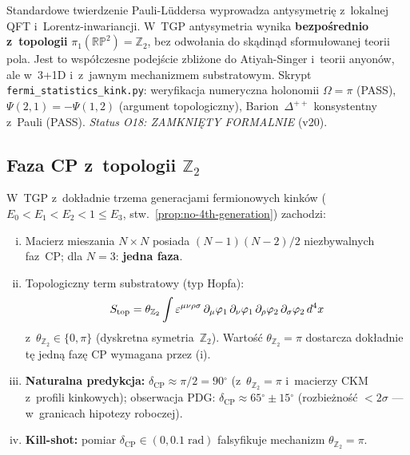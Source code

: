\begin{remark}\label{rem:spin-stat}
Standardowe twierdzenie Pauli-L\"uddersa wyprowadza antysymetri\k{e}
z~lokalnej QFT i~Lorentz-inwariancji.
W~TGP antysymetria wynika \textbf{bezpo\'srednio z~topologii}
$\pi_1(\mathbb{RP}^2) = \mathbb{Z}_2$, bez odwo\l{}ania do
sk\k{a}din\k{a}d sformu\l{}owanej teorii pola.
Jest to wsp\'o\l{}czesne podej\'scie zbli\.zone do Atiyah-Singer
i~teorii anyon\'ow, ale w~3+1D i~z~jawnym mechanizmem substratowym.
Skrypt \texttt{fermi\_statistics\_kink.py}:
weryfikacja numeryczna holo\-nomii $\Omega = \pi$ (PASS),
$\Psi(2,1) = -\Psi(1,2)$ (argument topologiczny),
Barion~$\Delta^{++}$ konsystentny z~Pauli (PASS).
\emph{Status O18: ZAMKNI\k{E}TY FORMALNIE} (v20).
\end{remark}

\subsection{Faza CP z~topologii $\mathbb{Z}_2$}\label{ssec:cp-violation}

\begin{proposition}[Konieczno\'s\'c naruszenia CP przy $N_{\rm gen}=3$]%
\label{prop:CP-necessity}
W~TGP z~dok\l{}adnie trzema generacjami fermionowych kink\'ow
($E_0 < E_1 < E_2 < 1 \le E_3$, stw.~\ref{prop:no-4th-generation})
zachodzi:
\begin{enumerate}[(i)]
  \item Macierz mieszania $N\times N$ posiada $(N-1)(N-2)/2$
    niezbywalnych faz~CP; dla $N = 3$: \textbf{jedna faza}.
  \item Topologiczny term substratowy (typ Hopfa):
    \begin{equation}\label{eq:S-top-Z2}
      S_{\rm top} = \theta_{\mathbb{Z}_2}
        \int \varepsilon^{\mu\nu\rho\sigma}\,
        \partial_\mu\varphi_1\,\partial_\nu\varphi_1\,
        \partial_\rho\varphi_2\,\partial_\sigma\varphi_2\,d^4x
    \end{equation}
    z~$\theta_{\mathbb{Z}_2} \in \{0, \pi\}$ (dyskretna symetria~$\mathbb{Z}_2$).
    Warto\'s\'c $\theta_{\mathbb{Z}_2} = \pi$ dostarcza dok\l{}adnie
    t\k{e} jedn\k{a} faz\k{e} CP wymagana przez (i).
  \item \textbf{Naturalna predykcja:} $\delta_{\mathrm{CP}} \approx \pi/2 = 90{^\circ}$
    (z~$\theta_{\mathbb{Z}_2} = \pi$ i~macierzy CKM z~profili kinkowych);
    obserwacja PDG: $\delta_{\mathrm{CP}} \approx 65{^\circ} \pm 15{^\circ}$
    (rozbie\.zno\'s\'c $<\!2\sigma$ --- w~granicach hipotezy roboczej).
  \item \textbf{Kill-shot:} pomiar $\delta_{\mathrm{CP}} \in (0, 0.1\;\mathrm{rad})$
    falsyfikuje mechanizm $\theta_{\mathbb{Z}_2} = \pi$.
\end{enumerate}
\end{proposition}

